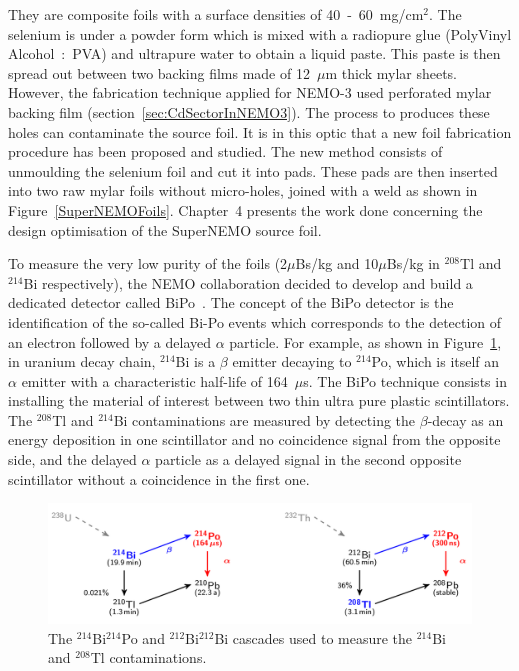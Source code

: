 \documentclass[main.tex]{subfiles}
\begin{document}
\NI They are composite foils with a surface densities of 40~-~60~mg/cm$^\text{2}$. The selenium is under a powder form which is mixed with a radiopure glue (PolyVinyl Alcohol~:~PVA) and ultrapure water to obtain a liquid paste. This paste is then spread out between two backing films made of 12~$\mu$m thick mylar sheets. However, the fabrication technique applied for NEMO-3 used perforated mylar backing film (section~\ref{sec:CdSectorInNEMO3}). The process to produces these holes can contaminate the source foil. It is in this optic that a new foil fabrication procedure has been proposed and studied. The new method consists of unmoulding the selenium foil and cut it into pads. These pads are then inserted into two raw mylar foils without micro-holes, joined with a weld as shown in Figure~\ref{SuperNEMOFoils}. Chapter~4 presents the work done concerning the design optimisation of the SuperNEMO source foil.

\bigskip


\NI To measure the very low purity of the foils (2$\mu$Bs/kg and 10$\mu$Bs/kg in $^{\text{208}}$Tl and $^{\text{214}}$Bi respectively), the NEMO collaboration decided to develop and build a dedicated detector called BiPo~\cite{BiPoDetector}. The concept of the BiPo detector is the identification of the so-called Bi-Po events which corresponds to the detection of an electron followed by a delayed $\alpha$ particle. For example, as shown in Figure~\ref{BiPoDecayChain}, in uranium decay chain, $^{\text{214}}$Bi is a $\beta$ emitter decaying to $^{\text{214}}$Po, which is itself an $\alpha$ emitter with a characteristic half-life of 164~$\mu$s. The BiPo technique consists in installing the material of interest between two thin ultra pure plastic scintillators. The $^{\text{208}}$Tl and $^{\text{214}}$Bi contaminations are measured by detecting the $\beta$-decay as an energy deposition in one scintillator and no coincidence signal from the opposite side, and the delayed $\alpha$ particle as a delayed signal in the second opposite scintillator without a coincidence in the first one. 


\begin{figure}[h!]
\begin{center}
\includegraphics[scale=0.33]{pictures/Chap3/BiPoDecayChain.png}
\caption{The $^{\text{214}}$Bi$^{\text{214}}$Po and $^{\text{212}}$Bi$^{\text{212}}$Bi cascades used to measure the $^{\text{214}}$Bi and $^{\text{208}}$Tl contaminations.}
\label{BiPoDecayChain}
\end{center}
\end{figure}
\end{document}
